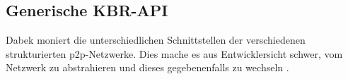 \subsection*{Generische KBR-API}
\label{chap:evaluation_p2p:generic_api}
Dabek moniert die unterschiedlichen Schnittstellen der verschiedenen strukturierten p2p-Netzwerke. Dies mache es aus Entwicklersicht schwer, vom Netzwerk zu abstrahieren und dieses gegebenenfalls zu wechseln \cite{Dabek2003Towards}.


